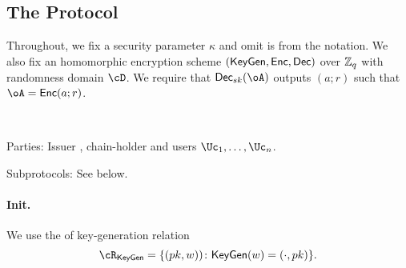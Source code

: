 \subsection{The Protocol}\label{sec:MainProtocol:Protocol}
Throughout, we fix a security parameter $\kappa$ and omit is from the notation. We also fix an homomorphic encryption scheme $(\mathsf{KeyGen},\mathsf{Enc},\mathsf{Dec})$ over ${\mathbb Z}_q$ with randomness domain $\cD$.  We require that $\Dec_{sk}(\oA)$ outputs   $(a;r)$ such that $\oA = \Enc(a;r)$.


\begin{protocol}~\label{prot:ConfidentialTransactions}


	
\item[Parties:] Issuer \Ic, chain-holder \Cc and users  $\Uc_1, \ldots,\Uc_n$.


\item[Subprotocols:]  See below.
\end{protocol}


\paragraph{Init.}
\newcommand{\rKeyGen}{{\cR_{\sf KeyGen}}}

\newcommand{\rKeyGenDef}
{
	 \set{(pk,w))\colon \KeyGen(w)= (\cdot,pk)}
}


We use the   of  key-generation relation  
$$\rKeyGen =\rKeyGenDef.$$


